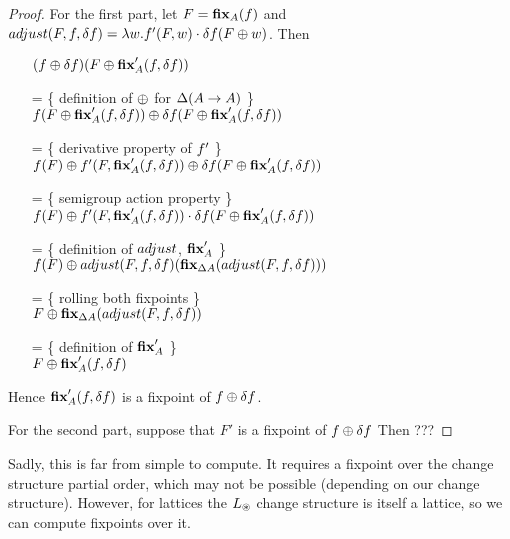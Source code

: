 \begin{proof}
  For the first part, let
  $F = \textbf{fix}_A(f)$ and
  $adjust(F, f, \delta f) = \lambda w . f'(F, w) \cdot
  \delta f(F \oplus w)$.
  Then
  \begin{itemize}
  \item[ ]
    $
    (f \oplus \delta f)(F \oplus \textbf{fix}_A'(f, \delta f))
    $
  \item[=]\{ definition of $\oplus$ for $\Delta (A \rightarrow A)$ \}\\
    $
    f(F \oplus \textbf{fix}_A'(f, \delta f))
    \oplus
    \delta f(F \oplus \textbf{fix}_A'(f, \delta f))
    $
  \item[=]\{ derivative property of $f'$ \}\\
    $
    f(F)
    \oplus
    f'(F, \textbf{fix}_A'(f, \delta f))
    \oplus
    \delta f(F \oplus \textbf{fix}_A'(f, \delta f))
    $
  \item[=]\{ semigroup action property \}\\
    $
    f(F)
    \oplus
    f'(F, \textbf{fix}_A'(f, \delta f))
    \cdot
    \delta f(F \oplus \textbf{fix}_A'(f, \delta f))
    $
  \item[=]\{ definition of $adjust$, $\textbf{fix}_A'$ \}\\
    $
    f(F)
    \oplus
    adjust(F, f, \delta f)(\textbf{fix}_{\Delta A}(adjust(F, f, \delta f)))
    $
  \item[=]\{ rolling both fixpoints \}\\
    $
    F
    \oplus
    \textbf{fix}_{\Delta A}(adjust(F, f, \delta f))
    $
  \item[=]\{ definition of $\textbf{fix}_A'$ \}\\
    $
    F
    \oplus
    \textbf{fix}_A'(f, \delta f)
    $
  \end{itemize}

  Hence $\textbf{fix}_A'(f, \delta f)$ is a fixpoint of $f \oplus \delta f$.

  For the second part, suppose that $F'$ is a fixpoint of $f \oplus \delta f$
  Then ???
\end{proof}

Sadly, this is far from simple to compute. It requires a fixpoint over the
change structure partial order, which may not be possible (depending on our
change structure). However, for lattices the $L_\circledast$ change structure is
itself a lattice, so we can compute fixpoints over it.

